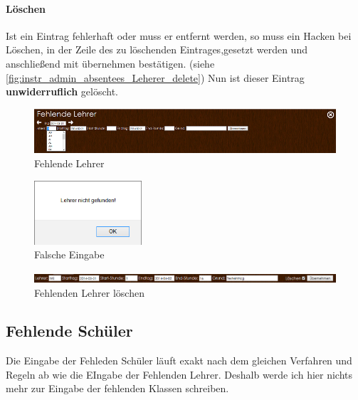 \paragraph{Löschen}
Ist ein Eintrag fehlerhaft oder muss er entfernt werden, so muss ein Hacken bei Löschen, in der Zeile des zu löschenden Eintrages,gesetzt werden und anschließend mit übernehmen bestätigen. (siehe \autoref{fig:instr_admin_absentees_Leherer_delete}) Nun ist dieser Eintrag \textbf{unwiderruflich} gelöscht.
\begin{figure}[H]
\centering
\includegraphics[keepaspectratio=true, width=16cm]{images/screenshots/absentees_teacher.png}
\caption{Fehlende Lehrer}
\label{fig:instr_admin_absentees_Lehrer}
\end{figure}
\begin{figure}[H]
\centering
\includegraphics[keepaspectratio=true, width=4cm]{images/screenshots/input_fail_teacher.png}
\caption{Falsche Eingabe}
\label{fig:instr_admin_absentees_fail}
\end{figure}
\begin{figure}[H]
\centering
\includegraphics[keepaspectratio=true, width=16cm]{images/screenshots/absentees_teacher_delete.png}
\caption{Fehlenden Lehrer löschen}
\label{fig:instr_admin_absentees_Leherer_delete}
\end{figure}
\subsection{Fehlende Schüler}
Die Eingabe der Fehleden Schüler läuft exakt nach dem gleichen Verfahren und Regeln ab wie die EIngabe der Fehlenden Lehrer. Deshalb werde ich hier nichts mehr zur Eingabe der fehlenden Klassen schreiben.